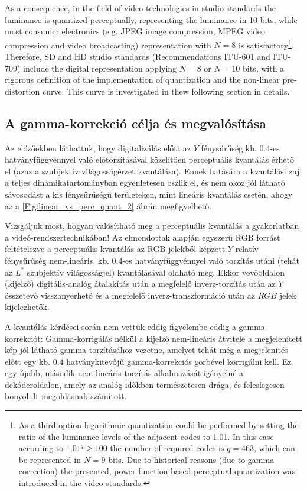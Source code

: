 As a consequence, in the field of video technologies in studio standards the luminance is quantized perceptually, representing the luminance in 10 bits, while most consumer electronics (e.g. JPEG image compression, MPEG video compression and video broadcasting) representation with $N=8$ is satisfactory\footnote{
As a third option logarithmic quantization could be performed by setting the ratio of the luminance levels of the adjacent codes to 1.01.
In this case according to $1.01^q \geq 100$ the number of required codes is $q = 463$, which can be represented in $N = 9$ bits.
Due to historical reasons (due to gamma correction) the presented, power function-based perceptual quantization was introduced in the video standards.}.
Therefore, SD and HD studio standards (Recommendations ITU-601 and ITU-709) include the digital representation applying $N = 8$ or $N = 10$ bits, with a rigorous definition of the implementation of quantization and the non-linear pre-distortion curve.
This curve is investigated in thew following section in details.

\subsection{A gamma-korrekció célja és megvalósítása}

Az előzőekben láthattuk, hogy digitalizálás előtt az $Y$ fénysűrűség kb. 0.4-es hatványfüggvénnyel való előtorzításával közelítően perceptuális kvantálás érhető el (azaz a szubjektív világosságérzet kvantálása).
Ennek hatására a kvantálási zaj a teljes dinamikatartományban egyenletesen oszlik el, és nem okoz jól látható sávosodást a kis fénysűrűségű területeken, mint lineáris kvantálás esetén, ahogy az a \ref{Fig:linear_vs_perc_quant_2} ábrán megfigyelhető.

Vizsgáljuk most, hogyan valósítható meg a perceptuális kvantálás a gyakorlatban a videó-rendszertechnikában!
Az elmondottak alapján egyszerű RGB forrást feltételezve a perceptuális kvantálás az RGB jelekből képzett $Y$ relatív fénysűrűség nem-lineáris, kb. 0.4-es hatványfüggvénnyel való torzítás utáni (tehát az $L^*$ szubjektív világosságjel) kvantálásával oldható meg.
Ekkor vevőoldalon (kijelző) digitális-analóg átalakítás után a megfelelő inverz-torzítás után az $Y$ összetevő visszanyerhető és a megfelelő inverz-transzformáció után az $RGB$ jelek kijelezhetők.

A kvantálás kérdései során nem vettük eddig figyelembe eddig a gamma-korrekciót: 
Gamma-korrigálás nélkül a kijelző nem-lineáris átvitele a megjelenített kép jól látható gamma-torzításához vezetne, amelyet tehát még a megjelenítés előtt egy kb. 0.4 hatványkitevőjű gamma-korrekciós görbével korrigálni kell.
Ez egy újabb, második nem-lineáris torzítás alkalmazását igényelné a dekóderoldalon, amely az analóg időkben természetesen drága, és feleslegesen bonyolult megoldásnak számított.

